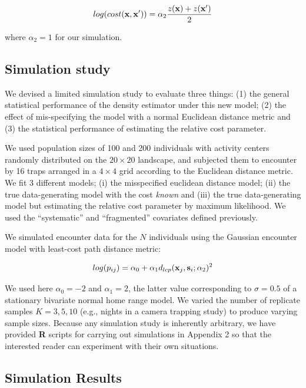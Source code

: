 \documentclass[12pt]{article}
\begin{document}
\begin{spacing}{1.8}
\[
 log(cost({\bf x},{\bf x}'))=  \alpha_2 \frac{z({\bf x}) + z({\bf x}')}{2}
\]

{\flushleft where} $\alpha_2 = 1$ for our simulation.


\subsection{Simulation study}

We devised a limited simulation study to evaluate three things: (1)
the general statistical performance of the density estimator under
this new model; (2) the effect of mis-specifying the model with a
normal Euclidean distance metric and (3) the statistical performance
of estimating the relative cost parameter.

We used population sizes of 100 and 200 individuals with activity
centers randomly distributed on the $20 \times 20$ landscape, and subjected them
to encounter by 16 traps arranged in a $4\times 4$ grid according to
the Euclidean distance metric. We fit 3 different models; (i) the
misspecified euclidean distance model; (ii) the true data-generating
model with the cost {\it known} and (iii) the true
data-generating model but estimating the relative cost parameter by
maximum likelihood.  We used the ``systematic'' and ``fragmented'' %
covariates defined previously.

We simulated encounter data for the $N$ individuals using the Gaussian
encounter model with least-cost path distance metric:

\[
log(p_{ij})= \alpha_{0} + \alpha_{1} d_{lcp}({\bf x}_{j},{\bf
  s}_{i}; \alpha_{2})^{2}
\]

{\flushleft We } used here $\alpha_{0} = -2$ and $\alpha_{1} = 2$, the latter value
corresponding to $\sigma = 0.5$ of a stationary bivariate normal home
range model.  We varied the number of replicate samples $K=3,5,10$
(e.g., nights in a camera trapping study) to produce varying sample
sizes.  Because any simulation study is inherently arbitrary, we have
provided {\bf R} scripts for carrying out simulations in Appendix 2 so
that the interested reader can experiment with their own situations.




\subsection{Simulation Results}


\end{spacing}
\end{document}
